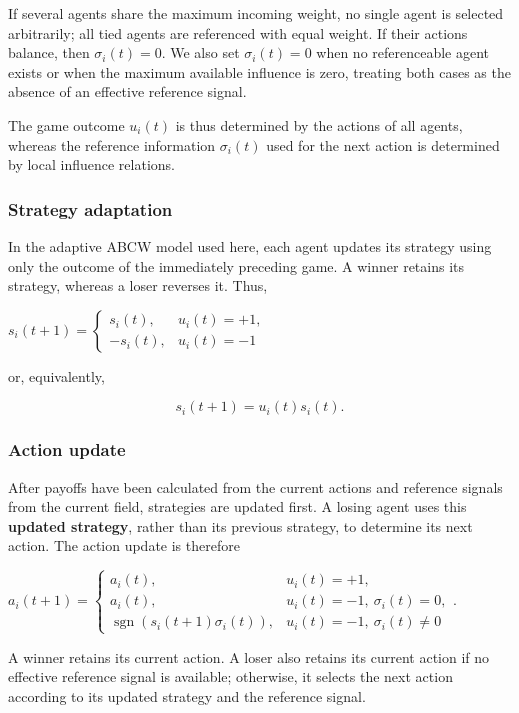 \documentclass[
  11pt,
]{article}
\begin{document}
If several agents share the maximum incoming weight, no single agent is
selected arbitrarily; all tied agents are referenced with equal weight.
If their actions balance, then \({\sigma_i(t)=0}\). We also set
\({\sigma_i(t)=0}\) when no referenceable agent exists or when the
maximum available influence is zero, treating both cases as the absence
of an effective reference signal.

The game outcome \({u_i(t)}\) is thus determined by the actions of all
agents, whereas the reference information \({\sigma_i(t)}\) used for the
next action is determined by local influence relations.

\subsubsection{Strategy adaptation}\label{strategy-adaptation}

In the adaptive ABCW model used here, each agent updates its strategy
using only the outcome of the immediately preceding game. A winner
retains its strategy, whereas a loser reverses it. Thus,

\({s_i(t+1)= \begin{cases} s_i(t),&u_i(t)=+1,\\ -s_i(t),&u_i(t)=-1 \end{cases}}\)

or, equivalently,

\[{s_i(t+1)=u_i(t)s_i(t).}\]

\subsubsection{Action update}\label{action-update}

After payoffs have been calculated from the current actions and
reference signals from the current field, strategies are updated first.
A losing agent uses this \textbf{updated strategy}, rather than its
previous strategy, to determine its next action. The action update is
therefore

\({a_i(t+1)= \begin{cases} a_i(t),&u_i(t)=+1,\\ a_i(t),&u_i(t)=-1,\ \sigma_i(t)=0,\\ \operatorname{sgn}\!\left(s_i(t+1)\sigma_i(t)\right),&u_i(t)=-1,\ \sigma_i(t)\neq0 \end{cases}.}\)

A winner retains its current action. A loser also retains its current
action if no effective reference signal is available; otherwise, it
selects the next action according to its updated strategy and the
reference signal.
\end{document}
